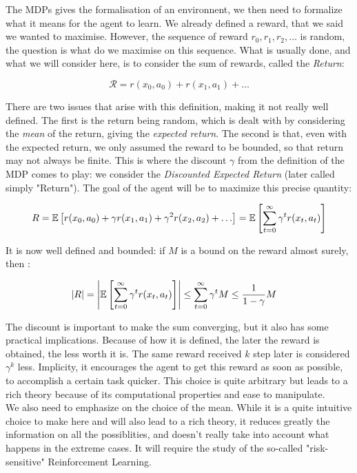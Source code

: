 The MDPs gives the formalisation of an environnent, we then need to formalize what it means for the agent to learn. We already defined a reward, that we said we wanted to maximise. However, the sequence of reward $r_0, r_1, r_2, \dots$ is random, the question is what do we maximise on this sequence. What is usually done, and what we will consider here, is to consider the sum of rewards, called the \emph{Return}:

\[ \mathcal{R} = r(x_0, a_0) + r(x_1, a_1) + \dots \]

There are two issues that arise with this definition, making it not really well defined. The first is the return being random, which is dealt with by considering the \emph{mean} of the return, giving the \emph{expected return}. The second is that, even with the expected return, we only assumed the reward to be bounded, so that return may not always be finite. This is where the discount $\gamma$ from the definition of the MDP comes to play: we consider the \emph{Discounted Expected Return} (later called simply "Return"). The goal of the agent will be to maximize this precise quantity:

\[ R = \EE{ r(x_0, a_0) + \gamma r(x_1, a_1) + \gamma^2 r(x_2, a_2) +  \dots} = \EE{\sum_{t=0}^\infty  \gamma^t r(x_t, a_t)} \]

It is now well defined and bounded: if $M$ is a bound on the reward almost surely, then :

\begin{align*}
    |R| = \left|\mathbb{E}\left[ \sum_{t=0}^\infty  \gamma^t r(x_t, a_t) \right]\right|& \leq \sum_{t=0} ^\infty  \gamma^t M \leq \frac{1}{1-\gamma}M
\end{align*}

The discount is important to make the sum converging, but it also has some practical implications. Because of how it is defined, the later the reward is obtained, the less worth it is. The same reward received $k$ step later is considered $\gamma^{k}$ less. Implicity, it encourages the agent to get this reward as soon as possible, to accomplish a certain task quicker. This choice is quite arbitrary but leads to a rich theory because of its computational properties and ease to manipulate.\\

We also need to emphasize on the choice of the mean. While it is a quite intuitive choice to make here and will also lead to a rich theory, it reduces greatly the information on all the possiblities, and doesn’t really take into account what happens in the extreme cases. It will require the study of the so-called "risk-sensitive" Reinforcement Learning.

